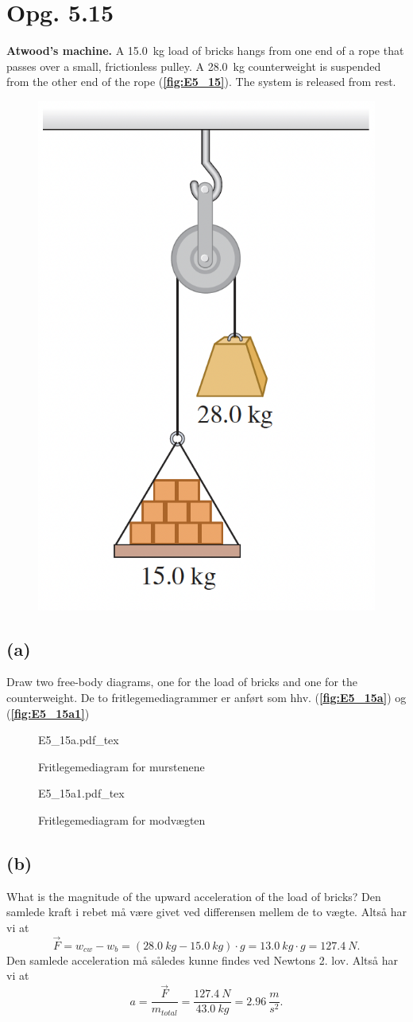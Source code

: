 \documentclass[12pt]{article}
\newcommand{\incfig}[2][1]{%
    \def\svgwidth{#1\columnwidth}
    {#2.pdf_tex}
}
\begin{document}
\section*{Opg. 5.15}
\textbf{Atwood's machine.} A \qty{15.0}{kg} load of bricks hangs from one end of a rope that passes over a small, frictionless pulley.
A \qty{28.0}{kg} counterweight is suspended from the other end of the rope (\textbf{\autoref{fig:E5_15}}). The system is released from rest.
\begin{figure} [ht]
  \centering
  \caption{}
  \includegraphics[width=0.25\linewidth]{../figures/E5_15.png}
  \label{fig:E5_15}
\end{figure}

\subsection*{(a)}
Draw two free-body diagrams, one for the load of bricks and one for the counterweight.
\bigbreak
De to fritlegemediagrammer er anført som hhv. (\textbf{\autoref{fig:E5_15a}}) og (\textbf{\autoref{fig:E5_15a1}}) 

\begin{figure}[ht]
  \begin{minipage}[c]{0.4\linewidth}
    \centering
    \incfig[1]{E5_15a}
    \caption{Fritlegemediagram for murstenene}
    \label{fig:E5_15a}
  \end{minipage}\hfill
  \begin{minipage}[c]{0.4\linewidth}
    \centering
    \incfig[1]{E5_15a1}
    \caption{Fritlegemediagram for modvægten}
    \label{fig:E5_15a1}
  \end{minipage}
\end{figure}  


\subsection*{(b)}
What is the magnitude of the upward acceleration of the load of bricks?
\bigbreak
Den samlede kraft i rebet må være givet ved differensen mellem de to vægte. Altså har vi at
\[
\Vec{F} = w_{cw} - w_{b} = (\qty{28,0}{kg} - \qty{15,0}{kg})\cdot g  = \qty{13,0}{kg} \cdot  g = \qty{127,4}{N}
.\]
Den samlede acceleration må således kunne findes ved Newtons 2. lov. Altså har vi at
\[
  a = \frac{\Vec{F}}{m_{total}} = \frac{\qty{127,4}{N}}{\qty{43.0}{kg}} = \qty{2,96}{\frac{m}{s^2}}
.\] 
\end{document}
